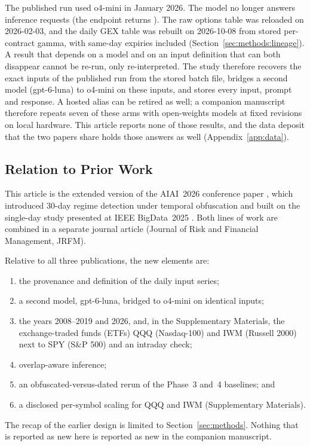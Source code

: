 The published run used o4-mini in January 2026. The model no longer answers inference requests (the endpoint returns ). The raw options table was reloaded on 2026-02-03, and the daily GEX table was rebuilt on 2026-10-08 from stored per-contract gamma, with same-day expiries included (Section~\ref{sec:methods:lineage}). A result that depends on a model and on an input definition that can both disappear cannot be re-run, only re-interpreted. The study therefore recovers the exact inputs of the published run from the stored batch file, bridges a second model (gpt-6-luna) to o4-mini on these inputs, and stores every input, prompt and response. A hosted alias can be retired as well; a companion manuscript \cite{regan2026openweights} therefore repeats seven of these arms with open-weights models at fixed revisions on local hardware. This article reports none of those results, and the data deposit that the two papers share holds those answers as well (Appendix~\ref{app:data}).

\subsection{Relation to Prior Work}
\label{sec:introduction:relation}

This article is the extended version of the AIAI~2026 conference paper \cite{regan2026regimes}, which introduced 30-day regime detection under temporal obfuscation and built on the single-day study presented at IEEE BigData~2025 \cite{regan2025obfuscation}. Both lines of work are combined in a separate journal article \cite{regan2026jrfm} (Journal of Risk and Financial Management, JRFM).

Relative to all three publications, the new elements are:
\begin{enumerate}[label=(\roman*),leftmargin=*,itemsep=0pt]
\item the provenance and definition of the daily input series;
\item a second model, gpt-6-luna, bridged to o4-mini on identical inputs;
\item the years 2008--2019 and 2026, and, in the Supplementary Materials, the exchange-traded funds (ETFs) QQQ (Nasdaq-100) and IWM (Russell 2000) next to SPY (S\&P 500) and an intraday check;
\item overlap-aware inference;
\item an obfuscated-versus-dated rerun of the Phase~3 and~4 baselines; and
\item a disclosed per-symbol scaling for QQQ and IWM (Supplementary Materials).
\end{enumerate}
The recap of the earlier design is limited to Section~\ref{sec:methods}. Nothing that is reported as new here is reported as new in the companion manuscript.

